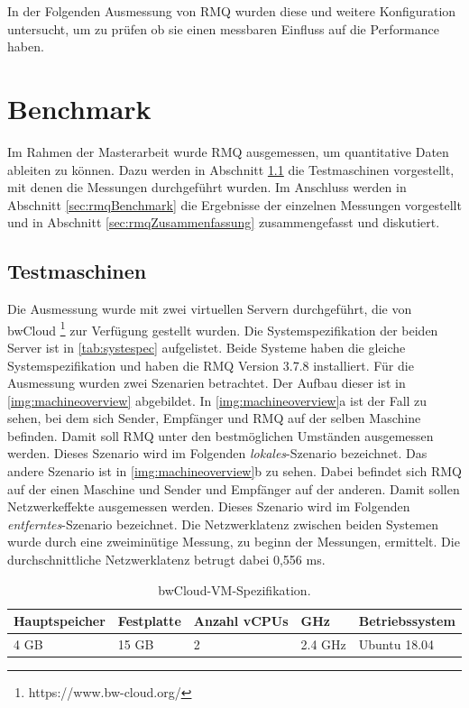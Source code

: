 In der Folgenden Ausmessung von RMQ wurden diese und weitere Konfiguration untersucht, um zu prüfen ob sie einen messbaren Einfluss auf die Performance haben.

\section{Benchmark}
Im Rahmen der Masterarbeit wurde RMQ ausgemessen, um quantitative Daten ableiten zu können. Dazu werden in Abschnitt \ref{sec:testmachine} die Testmaschinen vorgestellt, mit denen die Messungen durchgeführt wurden. Im Anschluss werden in Abschnitt \ref{sec:rmqBenchmark} die Ergebnisse der einzelnen Messungen vorgestellt und in Abschnitt \ref{sec:rmqZusammenfassung} zusammengefasst und diskutiert.

\subsection{Testmaschinen}
\label{sec:testmachine}
Die Ausmessung wurde mit zwei virtuellen Servern durchgeführt, die von bwCloud \footnote{https://www.bw-cloud.org/} zur Verfügung gestellt wurden. Die Systemspezifikation der beiden Server ist in \autoref{tab:systespec} aufgelistet. Beide Systeme haben die gleiche Systemspezifikation und haben die RMQ Version 3.7.8 installiert. Für die Ausmessung wurden zwei Szenarien betrachtet. Der Aufbau dieser ist in \autoref{img:machineoverview} abgebildet. In \autoref{img:machineoverview}a ist der Fall zu sehen, bei dem sich Sender, Empfänger und RMQ auf der selben Maschine befinden. Damit soll RMQ unter den bestmöglichen Umständen ausgemessen werden. Dieses Szenario wird im Folgenden \textit{lokales}-Szenario bezeichnet. Das andere Szenario ist in \autoref{img:machineoverview}b zu sehen. Dabei befindet sich RMQ auf der einen Maschine und Sender und Empfänger auf der anderen. Damit sollen Netzwerkeffekte ausgemessen werden. Dieses Szenario wird im Folgenden \textit{entferntes}-Szenario bezeichnet. Die Netzwerklatenz zwischen beiden Systemen wurde durch eine zweiminütige Messung, zu beginn der Messungen, ermittelt. Die durchschnittliche Netzwerklatenz betrugt dabei 0,556 ms. 

\begin{table}
  \centering
  \begin{tabular}{|l|l|l|l|l|}
    Hauptspeicher & Festplatte & Anzahl vCPUs & GHz & Betriebssystem \\
    \hline
     4 GB & 15 GB & 2 & 2.4 GHz & Ubuntu 18.04
  \end{tabular}
	\caption{\label{tab:systespec} bwCloud-VM-Spezifikation.}
\end{table}

